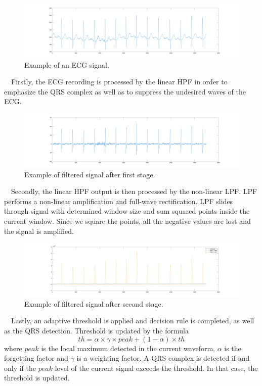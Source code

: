 \documentclass[a4paper,11pt]{article}
\begin{document}
\begin{figure}[ht!]
    \centering
    \includegraphics[width=160mm]{orig.png}
    \caption{Example of an ECG signal.}
\end{figure}

\newpage
\noindent
\ \ Firstly, the ECG recording is processed by the linear HPF in order to emphasize the QRS complex as well as to suppress the undesired waves of the ECG.

\begin{figure}[ht!]
    \centering
    \includegraphics[width=160mm]{2.png}
    \caption{Example of filtered signal after first stage.}
\end{figure}
\noindent
\ \ Secondly, the linear HPF output is then processed by the non-linear LPF. 
LPF performs a non-linear amplification and full-wave rectification. 
LPF slides through signal with determined window size and sum squared points inside the current window. 
Since we square the points, all the negative values are lost and the signal is amplified.

\begin{figure}[ht!]
    \centering
    \includegraphics[width=160mm]{3.png}
    \caption{Example of filtered signal after second stage.}
\end{figure}
\noindent
\ \ Lastly, an adaptive threshold is applied and decision rule is completed, as well as the QRS detection.
Threshold is updated by the formula
$$ th = \alpha \times \gamma \times peak + (1 - \alpha) \times th $$
where $peak$ is the local maximum detected in the current waveform, $\alpha$ is the forgetting factor and $\gamma$ is a weighting factor. A QRS complex is detected if and only if the $peak$ level of the current signal exceeds the threshold. In that case, the threshold is updated. 
\end{document}
